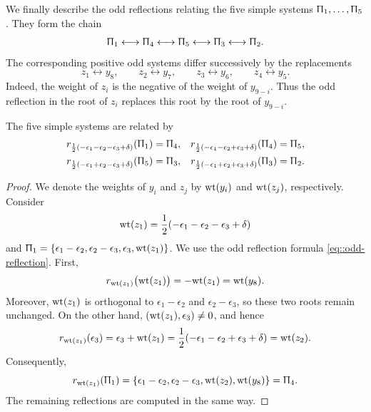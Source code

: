 We finally describe the odd reflections relating the five simple systems
$\Uppi_1,\ldots,\Uppi_5$. They form the chain
\begin{equation}
\Uppi_1
\longleftrightarrow
\Uppi_4
\longleftrightarrow
\Uppi_5
\longleftrightarrow
\Uppi_3
\longleftrightarrow
\Uppi_2.
\end{equation}
The corresponding positive odd systems differ successively by the
replacements
\[
z_1\longleftrightarrow y_8,\qquad
z_2\longleftrightarrow y_7,\qquad
z_3\longleftrightarrow y_6,\qquad
z_4\longleftrightarrow y_5.
\]
Indeed, the weight of $z_i$ is the negative of the weight of $y_{9-i}$.
Thus the odd reflection in the root of $z_i$ replaces this root by the
root of $y_{9-i}$.

\begin{lemma}\label{lemm::odd_reflections_F(4)}
The five simple systems are related by
\[
\begin{aligned}
r_{\frac12(-\epsilon_1-\epsilon_2-\epsilon_3+\delta)}(\Uppi_1)
&=\Uppi_4,
&
r_{\frac12(-\epsilon_1-\epsilon_2+\epsilon_3+\delta)}(\Uppi_4)
&=\Uppi_5,
\\
r_{\frac12(-\epsilon_1+\epsilon_2-\epsilon_3+\delta)}(\Uppi_5)
&=\Uppi_3,
&
r_{\frac12(-\epsilon_1+\epsilon_2+\epsilon_3+\delta)}(\Uppi_3)
&=\Uppi_2.
\end{aligned}
\]
\end{lemma}

\begin{proof} We denote the weights of $y_i$ and $z_j$ by ${\mathrm{wt}}(y_i)$ and
${\mathrm{wt}}(z_j)$, respectively. Consider
\[
{\mathrm{wt}}(z_1)
=
\frac12(-\epsilon_1-\epsilon_2-\epsilon_3+\delta)
\]
and
$ \Uppi_1 =  \{\epsilon_1-\epsilon_2,\epsilon_2-\epsilon_3,
\epsilon_3,{\mathrm{wt}}(z_1)\}$.
We use the odd reflection formula \eqref{eq::odd-reflection}. First,
\[
r_{{\mathrm{wt}}(z_1)}\bigl({\mathrm{wt}}(z_1)\bigr)
=
-{\mathrm{wt}}(z_1)
=
{\mathrm{wt}}(y_8).
\]
Moreover, ${\mathrm{wt}}(z_1)$ is orthogonal to $\epsilon_1-\epsilon_2$ and
$\epsilon_2-\epsilon_3$, so these two roots remain unchanged. On the
other hand, $({\mathrm{wt}}(z_1),\epsilon_3)\neq0$, and hence
\[
r_{{\mathrm{wt}}(z_1)}(\epsilon_3)
=
\epsilon_3+{\mathrm{wt}}(z_1)
=
\frac12(-\epsilon_1-\epsilon_2+\epsilon_3+\delta)
=
{\mathrm{wt}}(z_2).
\]
Consequently,
\[
r_{{\mathrm{wt}}(z_1)}(\Uppi_1)
=
\{\epsilon_1-\epsilon_2,\epsilon_2-\epsilon_3,
{\mathrm{wt}}(z_2),{\mathrm{wt}}(y_8)\}
=
\Uppi_4.
\]
The remaining reflections are computed in the same way.
\end{proof}



